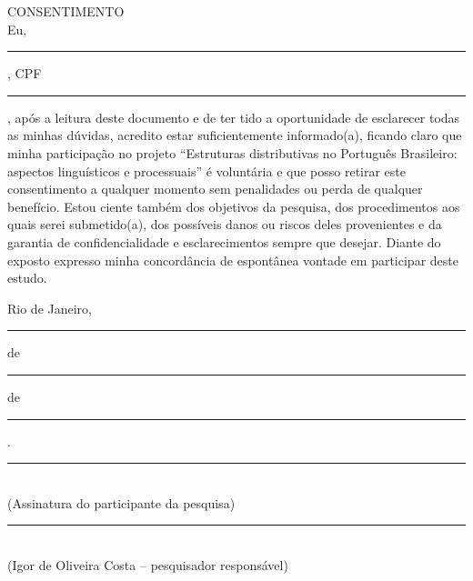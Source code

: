 \noindent CONSENTIMENTO \\
Eu, \rule[-1mm]{8cm}{0.3mm}, CPF \rule[-1mm]{5cm}{0.3mm}, após a leitura deste documento e de ter tido a oportunidade de esclarecer todas as minhas dúvidas, acredito estar suficientemente informado(a), ficando claro que minha participação no projeto ``Estruturas distributivas no Português Brasileiro: aspectos linguísticos e processuais'' é voluntária e que posso retirar este consentimento a qualquer momento sem penalidades ou perda de qualquer benefício. Estou ciente também dos objetivos da pesquisa, dos procedimentos aos quais serei submetido(a), dos possíveis danos ou riscos deles provenientes e da garantia de confidencialidade e esclarecimentos sempre que desejar.
Diante do exposto expresso minha concordância de espontânea vontade em participar deste estudo.

\begin{center}
  Rio de Janeiro, \rule[-1mm]{1cm}{0.3mm} de \rule[-1mm]{3cm}{0.3mm} de \rule[-1mm]{1.5cm}{0.3mm}.\\
  \vspace{1cm}
  \rule[-1mm]{8cm}{0.3mm}\\
  (Assinatura do participante da pesquisa)\\
  \vspace{1cm}
  \rule[-1mm]{8cm}{0.3mm}\\
  (Igor de Oliveira Costa -- pesquisador responsável)
\end{center}
